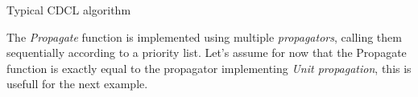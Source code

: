 \begin{algorithm}[h]\small
    \caption{Typical CDCL algorithm}
        \label{alg:cdcl}
        
\end{algorithm}

The \textit{Propagate} function is implemented using multiple \textit{propagators},
calling them sequentially according to a priority list.
Let's assume for now that the Propagate function is exactly equal to the propagator
implementing \textit{Unit propagation},
this is usefull for the next example.


